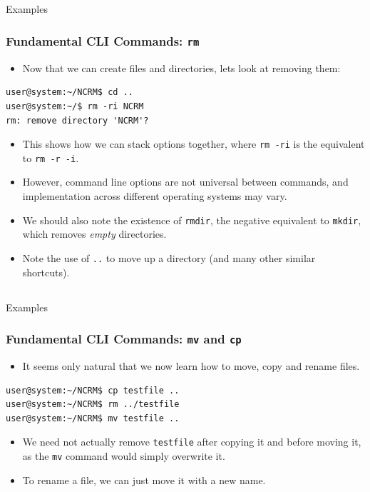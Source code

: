 \documentclass[10pt]{beamer}
\begin{document}
\subsection{}
\begin{frame}[fragile]{Examples}
\frametitle{Fundamental CLI Commands: \texttt{rm}}
\begin{itemize}
\item Now that we can create files and directories, lets look at removing them:
\end{itemize}
\begin{lstlisting}[style=BashInputStyle,title=The \texttt{rm} Command]
user@system:~/NCRM$ cd ..
user@system:~/$ rm -ri NCRM
rm: remove directory 'NCRM'?
\end{lstlisting}
\vspace{0.1in}
\begin{itemize}
\item This shows how we can stack options together, where \texttt{rm -ri} is the equivalent to \texttt{rm -r -i}. \vspace{0.05in}
\item However, command line options are not universal between commands, and implementation across different operating systems may vary.\vspace{0.05in}
\item We should also note the existence of \texttt{rmdir}, the negative equivalent to \texttt{mkdir}, which removes \emph{empty} directories. \vspace{0.05in}
\item Note the use of \texttt{..} to move up a directory (and many other similar shortcuts).
\end{itemize}
\end{frame}

\subsection{}
\begin{frame}[fragile]{Examples}
\frametitle{Fundamental CLI Commands: \texttt{mv} and \texttt{cp}}
\begin{itemize}
\item It seems only natural that we now learn how to move, copy and rename files.
\end{itemize}
\begin{lstlisting}[style=BashInputStyle,title=The \texttt{mv} and \texttt{cp} Commands]
user@system:~/NCRM$ cp testfile ..
user@system:~/NCRM$ rm ../testfile
user@system:~/NCRM$ mv testfile ..
\end{lstlisting}
\vspace{0.1in}
\begin{itemize}
\item We need not actually remove \texttt{testfile} after copying it and before moving it, as the \texttt{mv} command would simply overwrite it.\vspace{0.1in}
\item To rename a file, we can just move it with a new name. 
\end{itemize}
\end{frame}
\end{document}
